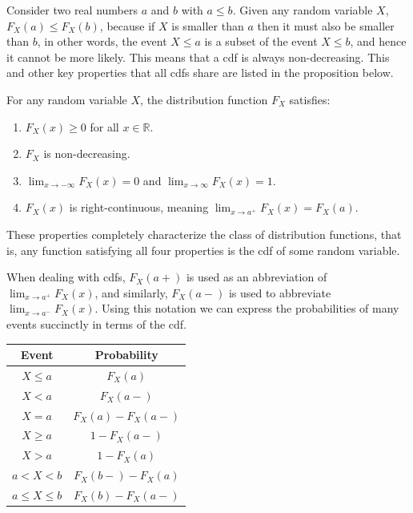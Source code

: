 Consider two real numbers $a$ and $b$ with $a \leq b$. Given any random variable $X$,  $F_X(a) \leq F_X(b)$, because if $X$ is smaller than $a$ then it must also be smaller than $b$, in other words, the event $X \leq a$ is a subset of the event $X \leq b$, and hence it cannot be more likely. This means that a cdf is always non-decreasing. This and other key properties that all cdfs share are listed in the proposition below.

\begin{proposition}\label{cdfproperties}
For any random variable $X$, the distribution function $F_X$ satisfies:
\vspace{-0.5em}
\begin{enumerate}
\item $F_X(x) \geq 0$ for all $x \in \mathbb{R}$.
\item $F_X$ is non-decreasing.
\item $\displaystyle\lim_{x \to -\infty} F_X(x) = 0$ and $\displaystyle\lim_{x \to \infty} F_X(x) = 1$.
\item $F_X(x)$ is right-continuous, meaning $\displaystyle\lim_{x \to a^{+}} F_X(x) = F_X(a)$.
\end{enumerate}
\end{proposition}

\begin{remark}These properties completely characterize the class of distribution functions, that is, any function satisfying all four properties is the cdf of some random variable.
\end{remark}

When dealing with cdfs, $F_X(a+)$ is used as an abbreviation of $\lim_{x \to a^{+}}F_X(x)$, and similarly, $F_X(a-)$ is used to abbreviate $\lim_{x \to a^{-}}F_X(x)$. Using this notation we can express the probabilities of many events succinctly in terms of the cdf.

\begin{center}
\begin{tabular}{c|c}
Event & Probability \\
\hline
$X \leq a$ & $F_X(a)$ \\
$X < a$ & $F_X(a-)$ \\
$X = a$ & $F_X(a) - F_X(a-)$ \\
$X \geq a$ & $1 - F_X(a-)$ \\
$X > a$ & $1 - F_X(a)$ \\
$a < X < b$ & $F_X(b-) - F_X(a)$ \\
$a \leq X \leq b$  & $F_X(b) - F_X(a-)$ \\
\end{tabular}
\end{center}

